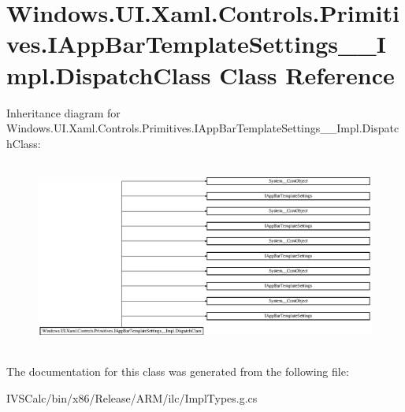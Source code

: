 \hypertarget{class_windows_1_1_u_i_1_1_xaml_1_1_controls_1_1_primitives_1_1_i_app_bar_template_settings_____impl_1_1_dispatch_class}{}\section{Windows.\+U\+I.\+Xaml.\+Controls.\+Primitives.\+I\+App\+Bar\+Template\+Settings\+\_\+\+\_\+\+Impl.\+Dispatch\+Class Class Reference}
\label{class_windows_1_1_u_i_1_1_xaml_1_1_controls_1_1_primitives_1_1_i_app_bar_template_settings_____impl_1_1_dispatch_class}
Inheritance diagram for Windows.\+U\+I.\+Xaml.\+Controls.\+Primitives.\+I\+App\+Bar\+Template\+Settings\+\_\+\+\_\+\+Impl.\+Dispatch\+Class\+:\begin{figure}[H]
\begin{center}
\leavevmode
\includegraphics[height=6.285715cm]{class_windows_1_1_u_i_1_1_xaml_1_1_controls_1_1_primitives_1_1_i_app_bar_template_settings_____impl_1_1_dispatch_class}
\end{center}
\end{figure}


The documentation for this class was generated from the following file\+:\begin{DoxyCompactItemize}
\item 
I\+V\+S\+Calc/bin/x86/\+Release/\+A\+R\+M/ilc/Impl\+Types.\+g.\+cs\end{DoxyCompactItemize}
